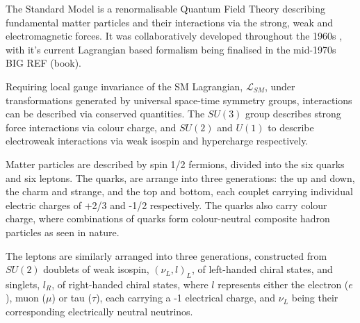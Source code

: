 The Standard Model is a renormalisable Quantum Field Theory describing
fundamental matter particles and their interactions via the strong,
weak and electromagnetic forces. It was collaboratively developed throughout the
1960s \cite
{Glashow1961579,PhysRevLett.19.1264,Salam:1968rm,PhysRevLett.30.1346,PhysRevLett.30.1343}, with it's current Lagrangian
based formalism being finalised in the mid-1970s BIG REF (book).

Requiring local gauge invariance of the SM Lagrangian, $\mathcal{L}_{SM}$,
under
transformations generated by universal space-time symmetry groups,
interactions can be described via conserved quantities. The $SU(3)$ group
describes strong force interactions via colour charge, and $SU(2)$ and $U(1)$ to
describe electroweak interactions via weak isospin and hypercharge respectively.


Matter particles are described by spin 1/2 fermions, divided into the six quarks
and six leptons. The quarks, are arrange into three generations: the up and
down, the charm and strange, and the top and bottom, each couplet carrying
individual electric charges of +2/3 and -1/2 respectively. The quarks also carry
colour charge, where combinations of quarks form colour-neutral composite
hadron particles as seen in nature.


The leptons are similarly arranged into three generations, constructed from
$SU(2)$
doublets of weak isospin, $(\nu_L, l)_L$, of left-handed chiral states, and
singlets, $l_R$, of right-handed chiral states, where $l$ represents either the
electron ($e$), muon ($\mu$) or tau ($\tau$), each carrying a -1 electrical
charge, and $\nu_L$ being their corresponding electrically neutral neutrinos.



